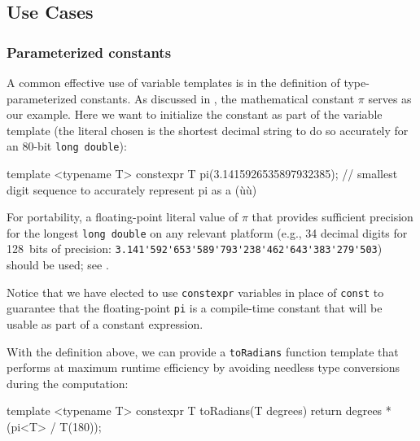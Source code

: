 \subsection[Use Cases]{Use Cases}\label{variabletemplate-use-cases}

\subsubsection[Parameterized constants]{Parameterized constants}\label{parametrized-constants}

A common effective use of variable templates is in the definition of
type-parameterized constants. As discussed in ,
the mathematical
constant $\pi$ serves as our example. Here we want to
initialize the constant as part of the variable template (the literal
chosen is the shortest decimal string to do so accurately for an 80-bit
\lstinline!long!~\lstinline!double!):

\begin{emcppslisting}[emcppsbatch=e4]
template <typename T>
constexpr T pi(3.1415926535897932385);
    // smallest digit sequence to accurately represent pi as a (ù{}ù)
\end{emcppslisting}
    
\noindent For
portability, a floating-point literal value of \(\pi\) that provides
sufficient precision for the longest \lstinline!long!~\lstinline!double! on
any relevant platform (e.g., 34 decimal digits for 128~bits of precision:
\lstinline!3.141'592'653'589'793'238'462'643'383'279'503!) should be
  used; see .

Notice that we have elected to use \lstinline!constexpr! variables in place of  \lstinline!const! to guarantee that the floating-point \lstinline!pi! is a compile-time constant that will be usable as part of a constant expression.

\newpage%
With the definition above, we can provide a
\lstinline!toRadians! function template that performs at maximum runtime
efficiency by avoiding needless type conversions during the computation:

\begin{emcppslisting}[emcppsbatch=e4]
template <typename T>
constexpr T toRadians(T degrees)
{
    return degrees * (pi<T> / T(180));
}
\end{emcppslisting}
    

